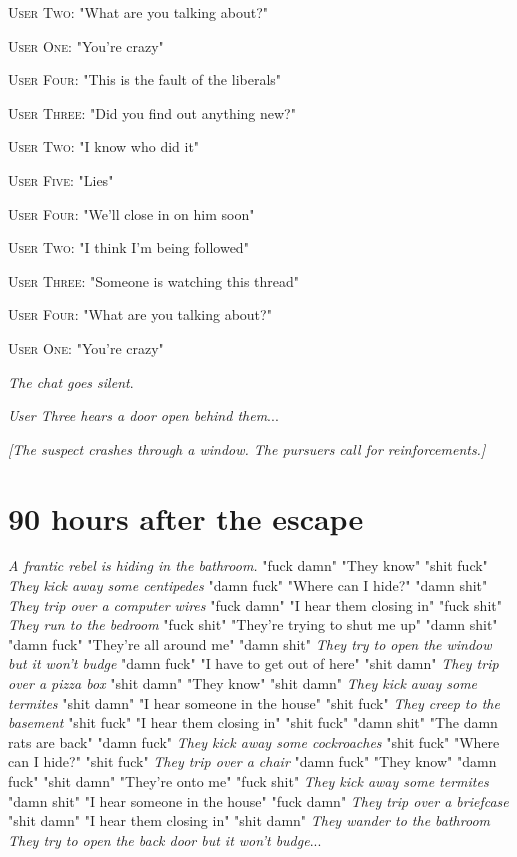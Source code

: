 \documentclass{report}
\begin{document}
\textsc{User Two}: "What are you talking about?" 

\textsc{User One}: "You're crazy" 

\textsc{User Four}: "This is the fault of the liberals" 

\textsc{User Three}: "Did you find out anything new?" 

\textsc{User Two}: "I know who did it" 

\textsc{User Five}: "Lies" 

\textsc{User Four}: "We'll close in on him soon" 

\textsc{User Two}: "I think I'm being followed" 

\textsc{User Three}: "Someone is watching this thread" 

\textsc{User Four}: "What are you talking about?" 

\textsc{User One}: "You're crazy" 

\textit{The chat goes silent}. 

\textit{User Three hears a door open behind them}...

\textit{[The suspect crashes through a window. The pursuers call for reinforcements.]}


\section*{90 \small{hours after the escape}}

\textit{A frantic rebel is hiding in the bathroom.} "fuck damn" "They know" "shit fuck" \textit{They kick away some centipedes} "damn fuck" "Where can I hide?" "damn shit" \textit{They trip over a computer wires} "fuck damn" "I hear them closing in" "fuck shit" \textit{They run to the bedroom} "fuck shit" "They're trying to shut me up" "damn shit" \textit{} "damn fuck" "They're all around me" "damn shit" \textit{They try to open the window but it won't budge} "damn fuck" "I have to get out of here" "shit damn" \textit{They trip over a pizza box} "shit damn" "They know" "shit damn" \textit{They kick away some termites} "shit damn" "I hear someone in the house" "shit fuck" \textit{They creep to the basement} "shit fuck" "I hear them closing in" "shit fuck" \textit{} "damn shit" "The damn rats are back" "damn fuck" \textit{They kick away some cockroaches} "shit fuck" "Where can I hide?" "shit fuck" \textit{They trip over a chair} "damn fuck" "They know" "damn fuck" \textit{} "shit damn" "They're onto me" "fuck shit" \textit{They kick away some termites} "damn shit" "I hear someone in the house" "fuck damn" \textit{They trip over a briefcase} "shit damn" "I hear them closing in" "shit damn" \textit{They wander to the bathroom} \textit{They try to open the back door but it won't budge}...
\end{document}
